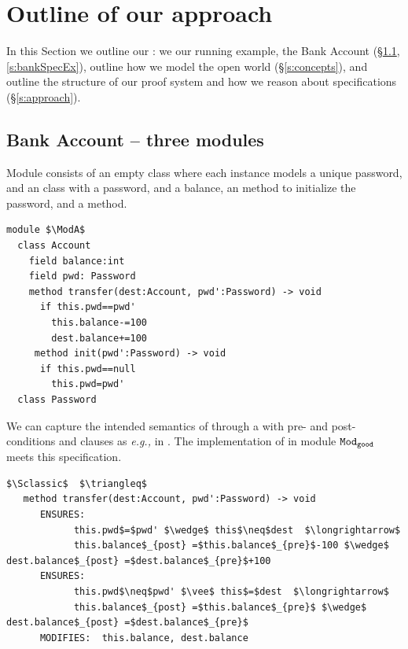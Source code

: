 

\section{Outline of our approach}
\label{s:outline}
 
In this Section we outline our :  
we  our running example, the Bank Account (\S\ref{s:bank},    \ref{s:bankSpecEx}),
   outline how we model the open world (\S\ref{s:concepts}), 
and outline the structure of our proof system and %
how we reason 
about \Nec specifications (\S\ref{s:approach}).
 

 \subsection{Bank Account -- three modules}
\label{s:bank}
  
Module \ModA consists of an empty 
 class where each instance models a unique password, and an   class with a password, and a balance, an  method to 
initialize the password, and 
a
 method. 
%
%
%
%
% 
\begin{lstlisting}[mathescape=true, language=Chainmail, frame=lines]
module $\ModA$
  class Account
    field balance:int 
    field pwd: Password
    method transfer(dest:Account, pwd':Password) -> void
      if this.pwd==pwd'
        this.balance-=100
        dest.balance+=100
     method init(pwd':Password) -> void
      if this.pwd==null
        this.pwd=pwd'
  class Password
\end{lstlisting}
%
\noindent 
We can capture the intended semantics of     
through  {a}  \funcSpec with pre- and post- conditions and  clauses as \emph{e.g.,} in \citeauthor{Leavens-etal07,dafny13}.
The implementation of   in module  ${\texttt{Mod}}_{{\texttt{good}}}$ meets
this specification.

\begin{lstlisting}[mathescape=true, frame=lines, language=Chainmail]
$\Sclassic$  $\triangleq$
   method transfer(dest:Account, pwd':Password) -> void  
      ENSURES:
            this.pwd$=$pwd' $\wedge$ this$\neq$dest  $\longrightarrow$  
            this.balance$_{post} =$this.balance$_{pre}$-100 $\wedge$ dest.balance$_{post} =$dest.balance$_{pre}$+100
      ENSURES:
            this.pwd$\neq$pwd' $\vee$ this$=$dest  $\longrightarrow$ 
            this.balance$_{post} =$this.balance$_{pre}$ $\wedge$ dest.balance$_{post} =$dest.balance$_{pre}$ 
      MODIFIES:  this.balance, dest.balance        
\end{lstlisting}
 

